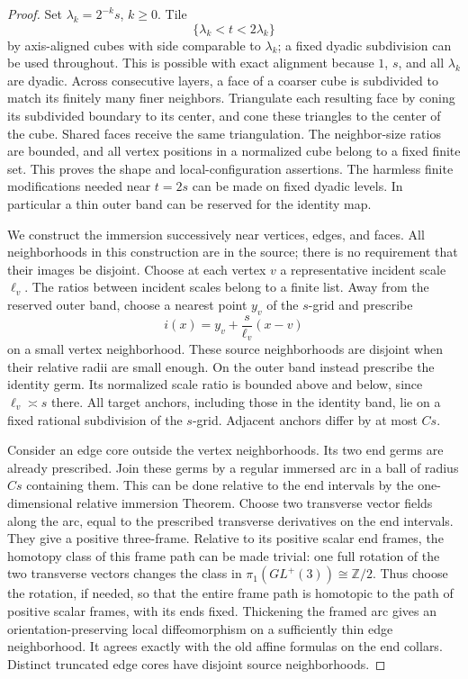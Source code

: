 \begin{proof}
Set $\lambda_k=2^{-k}s$, $k\geq0$.  Tile
\[
 \{\lambda_k<t<2\lambda_k\}
\]
by axis-aligned cubes with side comparable to $\lambda_k$; a fixed
dyadic subdivision can be used throughout.  This is possible with
exact alignment because $1$, $s$, and all $\lambda_k$ are dyadic.
Across consecutive layers, a face of a coarser cube is subdivided to
match its finitely many finer neighbors.  Triangulate each resulting
face by coning its subdivided boundary to its center, and cone these
triangles to the center of the cube.  Shared faces receive the same
triangulation.  The neighbor-size ratios are bounded, and all vertex
positions in a normalized cube belong to a fixed finite set.  This
proves the shape and local-configuration assertions.  The harmless
finite modifications needed near $t=2s$ can be made on fixed dyadic
levels.  In particular a thin outer band can be reserved for the
identity map.

We construct the immersion successively near vertices, edges, and
faces.  All neighborhoods in this construction are in the source;
there is no requirement that their images be disjoint.  Choose at each
vertex $v$ a representative incident scale $\ell_v$.  The ratios between
incident scales belong to a finite list.  Away from the reserved outer
band, choose a nearest point $y_v$ of the $s$-grid and prescribe
\[
 i(x)=y_v+\frac{s}{\ell_v}(x-v)
\]
on a small vertex neighborhood.  These source neighborhoods are
disjoint when their relative radii are small enough.  On the outer
band instead prescribe the identity germ.  Its normalized scale ratio
is bounded above and below, since $\ell_v\asymp s$ there.  All target
anchors, including those in the identity band, lie on a fixed rational
subdivision of the $s$-grid.  Adjacent anchors differ by at most $Cs$.

Consider an edge core outside the vertex neighborhoods.  Its two end
germs are already prescribed.  Join these germs by a regular immersed
arc in a ball of radius $Cs$ containing them.  This can be done relative
to the end intervals by the one-dimensional relative immersion
Theorem.  Choose two transverse vector fields along the arc, equal to
the prescribed transverse derivatives on the end intervals.  They
give a positive three-frame.  Relative to its positive scalar end
frames, the homotopy class of this frame path can be made trivial:
one full rotation of the two transverse vectors changes the class in
$\pi_1(GL^+(3))\cong\mathbb Z/2$.  Thus choose the rotation, if needed,
so that the entire frame path is homotopic to the path of positive
scalar frames, with its ends fixed.  Thickening the framed arc gives
an orientation-preserving local diffeomorphism on a sufficiently thin
edge neighborhood.  It agrees exactly with the old affine formulas on
the end collars.  Distinct truncated edge cores have disjoint source
neighborhoods.


\end{proof}
